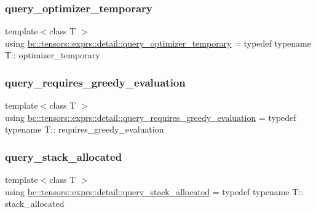 \subsubsection{\texorpdfstring{query\+\_\+optimizer\+\_\+temporary}{query\_optimizer\_temporary}}
{\footnotesize\ttfamily template$<$class T $>$ \\
using \hyperlink{namespacebc_1_1tensors_1_1exprs_1_1detail_acc14ea393b9060eea11b720233170f80}{bc\+::tensors\+::exprs\+::detail\+::query\+\_\+optimizer\+\_\+temporary} = typedef typename T\+:: optimizer\+\_\+temporary}

\mbox{\label{namespacebc_1_1tensors_1_1exprs_1_1detail_a0e9b0b3486b5ec529b2c622f14b688f9}} 
\subsubsection{\texorpdfstring{query\+\_\+requires\+\_\+greedy\+\_\+evaluation}{query\_requires\_greedy\_evaluation}}
{\footnotesize\ttfamily template$<$class T $>$ \\
using \hyperlink{namespacebc_1_1tensors_1_1exprs_1_1detail_a0e9b0b3486b5ec529b2c622f14b688f9}{bc\+::tensors\+::exprs\+::detail\+::query\+\_\+requires\+\_\+greedy\+\_\+evaluation} = typedef typename T\+:: requires\+\_\+greedy\+\_\+evaluation}

\mbox{\label{namespacebc_1_1tensors_1_1exprs_1_1detail_a35543bad82197de0bb8d50c079e7cbaf}} 
\subsubsection{\texorpdfstring{query\+\_\+stack\+\_\+allocated}{query\_stack\_allocated}}
{\footnotesize\ttfamily template$<$class T $>$ \\
using \hyperlink{namespacebc_1_1tensors_1_1exprs_1_1detail_a35543bad82197de0bb8d50c079e7cbaf}{bc\+::tensors\+::exprs\+::detail\+::query\+\_\+stack\+\_\+allocated} = typedef typename T\+:: stack\+\_\+allocated}

